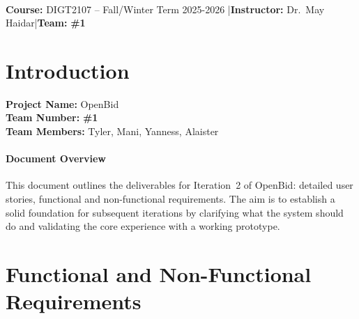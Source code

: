 \documentclass[11pt]{article}
\title{\course\\\large \iteration\\[6pt]\project}
\author{\teammates}
\date{\duedate}
\newcommand{\project}{OpenBid}
\newcommand{\instructor}{Dr.\ May Haidar}
\newcommand{\teamnum}{1}
\newcommand{\teammates}{Tyler, Mani, Yanness, Alaister}
\begin{document}
\maketitle

\begin{center}
\textbf{Course:} DIGT2107 -- Fall/Winter Term 2025-2026 \quad|\quad \textbf{Instructor:} \instructor \quad|\quad \textbf{Team:} \textbf{\#\teamnum}
\end{center}

\newpage

\section{Introduction}
\textbf{Project Name:} \project\\
\textbf{Team Number:} \textbf{\#\teamnum}\\
\textbf{Team Members:} \teammates

\paragraph{Document Overview}
This document outlines the deliverables for Iteration~2 of \project: detailed user stories, functional and non-functional requirements. The aim is to establish a solid foundation for subsequent iterations by clarifying what the system should do and validating the core experience with a working prototype.

\section{Functional and Non-Functional Requirements}
\end{document}
